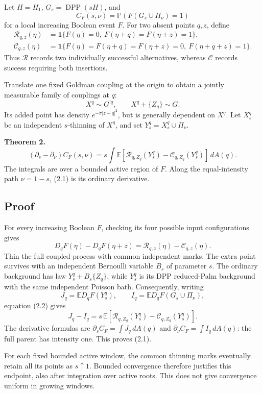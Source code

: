\documentclass[11pt,a4paper]{article}
\theoremstyle{definition}
\theoremstyle{remark}
\numberwithin{equation}{section}
\begin{document}
Let \(H=H_1\), \(G_s=\operatorname{DPP}(sH)\), and \[
C_F(s,\nu)=\mathbb P(F(G_s\cup\Pi_\nu)=1)
\] for a local increasing Boolean event \(F\). For two absent points \(q,z\), define \[
\begin{aligned}
\mathcal R_{q,z}(\eta)
 &=\mathbf1\{F(\eta)=0,\ F(\eta+q)=F(\eta+z)=1\},\\
\mathcal C_{q,z}(\eta)
 &=\mathbf1\{F(\eta)=F(\eta+q)=F(\eta+z)=0,\
                         F(\eta+q+z)=1\}.
\end{aligned}
\] Thus \(\mathcal R\) records two individually successful alternatives, whereas \(\mathcal C\) records success requiring both insertions.

Translate one fixed Goldman coupling at the origin to obtain a jointly measurable family of couplings at \(q\): \[
X^q\sim G^{!q},\qquad X^q+\{Z_q\}\sim G.
\] Its added point has density \(e^{-\pi|z-q|^2}\), but is generally dependent on \(X^q\). Let \(X_s^q\) be an independent \(s\)-thinning of \(X^q\), and set \(Y_s^q=X_s^q\cup\Pi_\nu\).

\textbf{Theorem 2.} \[
\boxed{\quad
(\partial_s-\partial_\nu)C_F(s,\nu)
=s\int
\mathbb E\!\left[
 \mathcal R_{q,Z_q}(Y_s^q)-\mathcal C_{q,Z_q}(Y_s^q)
\right]\,dA(q).
\quad}
\tag{2.1}
\] The integrals are over a bounded active region of \(F\). Along the equal-intensity path \(\nu=1-s\), (2.1) is its ordinary derivative.

\hypertarget{proof}{%
\subsection{Proof}\label{proof}}

For every increasing Boolean \(F\), checking its four possible input configurations gives \[
D_qF(\eta)-D_qF(\eta+z)
=\mathcal R_{q,z}(\eta)-\mathcal C_{q,z}(\eta).
\tag{2.2}
\] Thin the full coupled process with common independent marks. The extra point survives with an independent Bernoulli variable \(B_s\) of parameter \(s\). The ordinary background has law \(Y_s^q+B_s\{Z_q\}\), while \(Y_s^q\) is its DPP reduced-Palm background with the same independent Poisson bath. Consequently, writing \[
J_q=\mathbb ED_qF(Y_s^q),\qquad
I_q=\mathbb ED_qF(G_s\cup\Pi_\nu),
\] equation (2.2) gives \[
J_q-I_q
=s\,\mathbb E[
\mathcal R_{q,Z_q}(Y_s^q)-\mathcal C_{q,Z_q}(Y_s^q)].
\] The derivative formulas are \(\partial_s C_F=\int J_q\,dA(q)\) and \(\partial_\nu C_F=\int I_q\,dA(q)\): the full parent has intensity one. This proves (2.1).

For each fixed bounded active window, the common thinning marks eventually retain all its points as \(s\uparrow1\). Bounded convergence therefore justifies this endpoint, also after integration over active roots. This does not give convergence uniform in growing windows.
\end{document}
